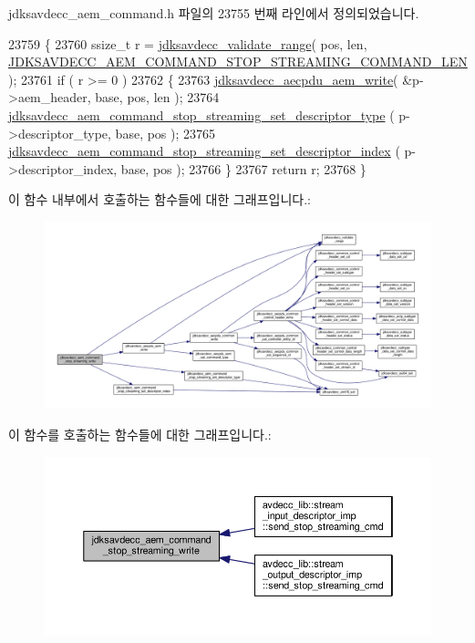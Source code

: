 jdksavdecc\+\_\+aem\+\_\+command.\+h 파일의 23755 번째 라인에서 정의되었습니다.


\begin{DoxyCode}
23759 \{
23760     ssize\_t r = \hyperlink{group__util_ga9c02bdfe76c69163647c3196db7a73a1}{jdksavdecc\_validate\_range}( pos, len, 
      \hyperlink{group__command__stop__streaming_ga37e2bec2217af78aed138bbf254234d0}{JDKSAVDECC\_AEM\_COMMAND\_STOP\_STREAMING\_COMMAND\_LEN} );
23761     \textcolor{keywordflow}{if} ( r >= 0 )
23762     \{
23763         \hyperlink{group__aecpdu__aem_gad658e55771cce77cecf7aae91e1dcbc5}{jdksavdecc\_aecpdu\_aem\_write}( &p->aem\_header, base, pos, len );
23764         \hyperlink{group__command__stop__streaming_ga84efe9079c247fd79b63a4b1834dfeaa}{jdksavdecc\_aem\_command\_stop\_streaming\_set\_descriptor\_type}
      ( p->descriptor\_type, base, pos );
23765         \hyperlink{group__command__stop__streaming_ga8c844ca5d74be6cc5894a61295ec21d4}{jdksavdecc\_aem\_command\_stop\_streaming\_set\_descriptor\_index}
      ( p->descriptor\_index, base, pos );
23766     \}
23767     \textcolor{keywordflow}{return} r;
23768 \}
\end{DoxyCode}


이 함수 내부에서 호출하는 함수들에 대한 그래프입니다.\+:
\nopagebreak
\begin{figure}[H]
\begin{center}
\leavevmode
\includegraphics[width=350pt]{group__command__stop__streaming_gab694a591019d29c8fa77482ac3a43f88_cgraph}
\end{center}
\end{figure}




이 함수를 호출하는 함수들에 대한 그래프입니다.\+:
\nopagebreak
\begin{figure}[H]
\begin{center}
\leavevmode
\includegraphics[width=350pt]{group__command__stop__streaming_gab694a591019d29c8fa77482ac3a43f88_icgraph}
\end{center}
\end{figure}


